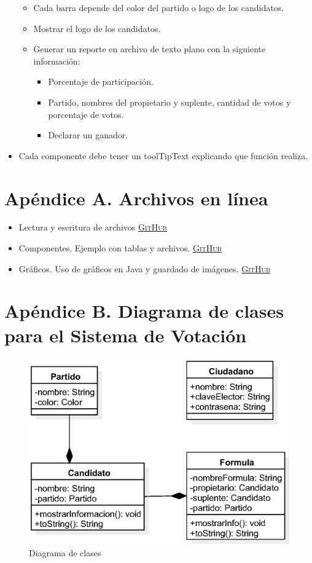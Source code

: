 \documentclass[11pt,a4paper]{article}
\begin{document}
\begin{itemize}
\begin{itemize}
\item Cada barra depende del color del partido o logo de los candidatos.
\item Mostrar el logo de los candidatos.
\item Generar un reporte en archivo de texto plano con la siguiente información:
\begin{itemize}
\item Porcentaje de participación.
\item Partido, nombres del propietario y suplente, cantidad de votos y porcentaje de votos.
\item Declarar un ganador.
\end{itemize}
\end{itemize} 
\item Cada componente debe tener un \textsf{toolTipText} explicando que función realiza.
\end{itemize}
\newpage


\section{Apéndice A. Archivos en línea}

\begin{itemize}
\item Lectura y escritura de archivos \href{https://github.com/eduardoschz/LaTex/tree/master/Cursos\%202018-2/GUI/GUI_Archivos}{\textsc{GitHub}}
\item  Componentes. Ejemplo con tablas y archivos. \href{https://github.com/eduardoschz/LaTex/tree/master/Cursos\%202018-2/GUI/GUI_Componentes}{\textsc{GitHub}}
\item Gráficos. Uso de gráficos en \textsf{Java} y guardado de imágenes. \href{https://github.com/eduardoschz/LaTex/tree/master/Cursos\%202018-2/GUI/GUI_Graficos}{\textsc{GitHub}}
\end{itemize}

\section{Apéndice B. Diagrama de clases para el Sistema de Votación}

\begin{center}
\begin{figure}[h]
\includegraphics[scale=0.6]{pics/sis.eps}
\caption{Diagrama de clases} 
\end{figure}
\end{center}
\newpage


\newpage


\end{document}
